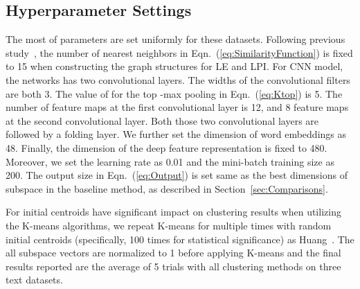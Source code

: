\documentclass[review]{elsarticle}
\begin{document}
\subsection{Hyperparameter Settings}
The most of parameters are set uniformly for these datasets. Following previous study~\cite{4_cai2005document}, the number of nearest neighbors in Eqn.~(\ref{eq:SimilarityFunction}) is fixed to 15 when constructing the graph structures for LE and LPI. For CNN model, the networks has two convolutional layers. The widths of the convolutional filters are both 3. The value of  for the top -max pooling in Eqn.~(\ref{eq:Ktop}) is 5. The number of feature maps at the first convolutional layer is 12, and 8 feature maps at the second convolutional layer. Both those two convolutional layers are followed by a folding layer. We further set the dimension of word embeddings  as 48. Finally, the dimension of the deep feature representation  is fixed to 480. Moreover, we set the learning rate  as 0.01 and the mini-batch training size as 200. The output size  in Eqn.~(\ref{eq:Output}) is set same as the best dimensions of subspace in the baseline method, as described in Section~\ref{sec:Comparisons}.

For initial centroids have significant impact on clustering results when utilizing the K-means algorithms, we repeat K-means for multiple times with random initial centroids (specifically, 100 times for statistical significance) as Huang~\cite{1_huang2014deep}. The all subspace vectors are normalized to 1 before applying K-means and the final results reported are the average of 5 trials with all clustering methods on three text datasets.
\end{document}
